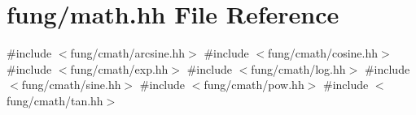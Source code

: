 \hypertarget{math_8hh}{\section{fung/math.hh \-File \-Reference}
\label{math_8hh}
}
{\ttfamily \#include $<$fung/cmath/arcsine.\-hh$>$}\*
{\ttfamily \#include $<$fung/cmath/cosine.\-hh$>$}\*
{\ttfamily \#include $<$fung/cmath/exp.\-hh$>$}\*
{\ttfamily \#include $<$fung/cmath/log.\-hh$>$}\*
{\ttfamily \#include $<$fung/cmath/sine.\-hh$>$}\*
{\ttfamily \#include $<$fung/cmath/pow.\-hh$>$}\*
{\ttfamily \#include $<$fung/cmath/tan.\-hh$>$}\*
